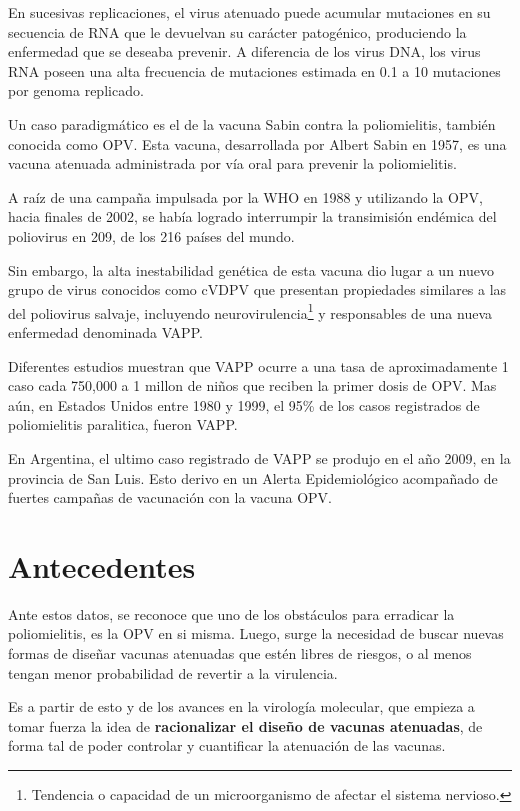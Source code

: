En sucesivas replicaciones, el virus atenuado puede acumular mutaciones en su
secuencia de \ac{RNA} que le devuelvan su car\'acter patog\'enico, produciendo
la enfermedad que se deseaba prevenir. A diferencia de los virus \ac{DNA}, los
virus \ac{RNA} poseen una alta frecuencia de mutaciones estimada en 0.1 a 10
mutaciones por genoma replicado\cite{Vignuzzi08}.

Un caso paradigm\'atico es el de la vacuna Sabin contra la poliomielitis,
tambi\'en conocida como \ac{OPV}. Esta vacuna, desarrollada por Albert Sabin en
1957, es una vacuna atenuada administrada por v\'ia oral para prevenir la
poliomielitis. 

A ra\'iz de una campa\~na impulsada por la \ac{WHO} en 1988 y utilizando la
\ac{OPV}, hacia finales de 2002, se hab\'ia logrado interrumpir la
transimisi\'on end\'emica del poliovirus en 209, de los 216 pa\'ises del
mundo\cite{Aylward04}. 

Sin embargo, la alta inestabilidad gen\'etica de esta vacuna dio lugar a
un nuevo grupo de virus conocidos como \ac{cVDPV} que presentan propiedades
similares a las del poliovirus salvaje, incluyendo
neurovirulencia\footnote{Tendencia o capacidad de un microorganismo de afectar
el sistema nervioso.} y responsables de una nueva enfermedad denominada
\ac{VAPP}. 

Diferentes estudios muestran que \ac{VAPP} ocurre a una tasa de
aproximadamente 1 caso cada 750,000 a 1 millon de ni\~nos que reciben la
primer dosis de \ac{OPV}\cite{Aylward04}. Mas a\'un, en Estados Unidos entre
1980 y 1999, el 95\% de los casos registrados de poliomielitis paralitica,
fueron \ac{VAPP}\cite{DeJesus07}.

En Argentina, el ultimo caso registrado de \ac{VAPP} se produjo en el a\~no
2009, en la provincia de San Luis\cite{msal09}. Esto derivo en un Alerta
Epidemiol\'ogico acompa\~nado de fuertes campa\~nas de vacunaci\'on con la
vacuna \ac{OPV}.

\section{Antecedentes}
\label{antecedentes}
Ante estos datos, se reconoce que uno de los obst\'aculos para erradicar la
poliomielitis, es la \ac{OPV} en si misma\cite{Chumakov08}. Luego, surge la
necesidad de buscar nuevas formas de dise\~nar vacunas atenuadas que est\'en
libres de riesgos, o al menos tengan menor probabilidad de revertir a la
virulencia.

Es a partir de esto y de los avances en la virolog\'ia molecular, que empieza
a tomar fuerza la idea de \textbf{racionalizar el dise\~no de vacunas
atenuadas}, de forma tal de poder controlar y cuantificar la atenuaci\'on de las
vacunas\cite{Lauring10}.


